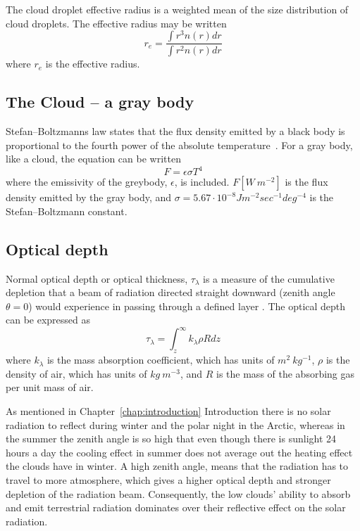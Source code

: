 The cloud droplet effective radius is a weighted mean of the size distribution of cloud droplets. The effective radius may be written
\begin{equation}
r_e = \frac{\int r^3 n(r) dr}{\int r^2 n(r) dr}
\end{equation}
where $r_e$ is the effective radius.

\subsection{The Cloud -- a gray body}
Stefan–Boltzmanns law states that the flux density emitted by a black body is proportional to the fourth power of the absolute temperature~\citep{Liou2002}. For a gray body, like a cloud, the equation can be written
\begin{equation}
F = \epsilon \sigma T^4
\end{equation}
where the emissivity of the greybody, $\epsilon$, is included. $F [W~m^{-2}]$ is the flux density emitted by the gray body, and $\sigma = 5.67\cdot 10^{-8} Jm^{-2}sec^{-1}deg^{-4}$ is the Stefan–Boltzmann constant.

\subsection{Optical depth}
Normal optical depth or optical thickness, $\tau_{\lambda}$ is a measure of the cumulative depletion that a beam of radiation directed straight downward (zenith angle $\theta = 0$) would experience in passing through a defined layer \citep{Wallace2006}. The optical depth can be expressed as
\begin{equation}
\tau_{\lambda} = \int_z^{\infty} k_{\lambda} \rho R dz
\end{equation}
where $k_{\lambda}$ is the mass absorption coefficient, which has units of $m^2~kg^{-1}$, $\rho$ is the density of air, which has units of $kg~m^{-3}$, and $R$ is the mass of the absorbing gas per unit mass of air.

As mentioned in Chapter~\ref{chap:introduction} Introduction there is no solar radiation to reflect during winter and the polar night in the Arctic, whereas in the summer the zenith angle is so high that even though there is sunlight 24 hours a day the cooling effect in summer does not average out the heating effect the clouds have in winter. A high zenith angle, means that the radiation has to travel to more atmosphere, which gives a higher optical depth and stronger depletion of the radiation beam. Consequently, the low clouds' ability to absorb and emit terrestrial radiation dominates over their reflective effect on the solar radiation.

